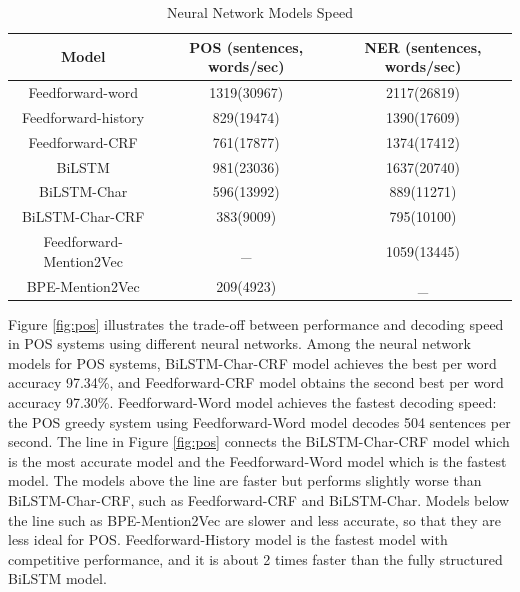 \documentclass{sfuthesis}
\begin{document}
\begin{table}[]
\centering
\caption{Neural Network Models Speed}
\label{table:my-label2}
\begin{tabular}{|c|c|c|}
\hline
Model       & POS  (sentences, words/sec)  & NER  (sentences, words/sec)      \\ \hline
Feedforward-word    & 1319(30967)     & 2117(26819)    \\ \hline
Feedforward-history & 829(19474)     & 1390(17609)     \\ \hline
Feedforward-CRF     & 761(17877)     & 1374(17412)     \\ \hline
BiLSTM             &981(23036)     & 1637(20740)       \\ \hline
BiLSTM-Char        & 596(13992)  & 889(11271)           \\ \hline
BiLSTM-Char-CRF    & 383(9009)  & 795(10100)         \\ \hline
Feedforward-Mention2Vec         & _      & 1059(13445)              \\ \hline
BPE-Mention2Vec     & 209(4923)  &  _               \\ \hline   
\end{tabular}
\end{table}

Figure \ref{fig:pos} illustrates the trade-off between performance and decoding speed in POS systems using different neural networks. Among the neural network models for POS systems, BiLSTM-Char-CRF model achieves the best per word accuracy 97.34\%, and Feedforward-CRF model obtains the second best per word accuracy 97.30\%. Feedforward-Word model achieves the fastest decoding speed: the POS greedy system using Feedforward-Word model decodes 504 sentences per second. The line in Figure \ref{fig:pos} connects the BiLSTM-Char-CRF model which is the most accurate model and the Feedforward-Word model which is the fastest model. The models above the line are faster but performs slightly worse than BiLSTM-Char-CRF, such as Feedforward-CRF and BiLSTM-Char. Models below the line such as BPE-Mention2Vec are slower and less accurate, so that they are less ideal for POS. Feedforward-History model is the fastest model with competitive performance, and it is about 2 times faster than the fully structured BiLSTM model.
\end{document}
